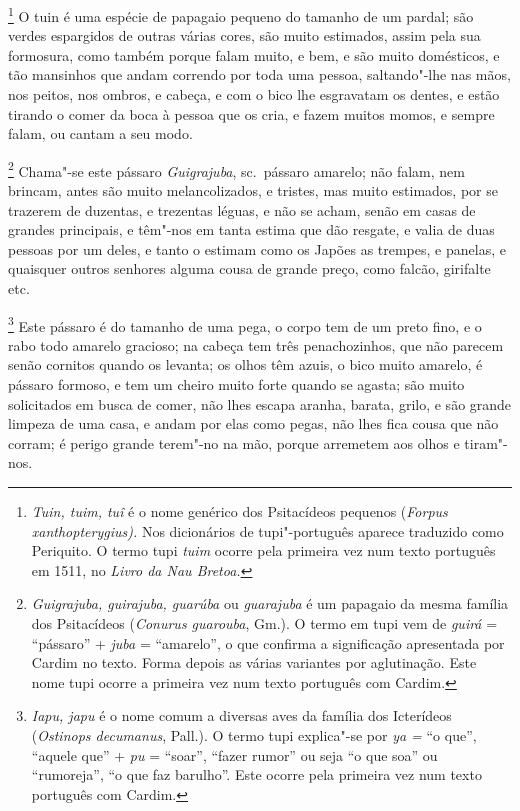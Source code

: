 \begin{linenumbers}
\footnote{ \textit{Tuin, tuim, tuî} é o nome genérico
dos Psitacídeos pequenos (\textit{Forpus xanthopterygius).} Nos
dicionários de tupi"-português aparece traduzido como Periquito. O termo
tupi \textit{tuim} ocorre pela primeira vez num texto português em
1511, no \textit{Livro da Nau Bretoa.}} O tuin é uma espécie
de papagaio pequeno do tamanho de um pardal; são verdes espargidos de
outras várias cores, são muito estimados, assim pela sua formosura,
como também porque falam muito, e bem, e são muito domésticos, e tão
mansinhos que andam correndo por toda uma pessoa, saltando"-lhe nas
mãos, nos peitos, nos ombros, e cabeça, e com o bico lhe esgravatam os
dentes, e estão tirando o comer da boca à pessoa que os cria, e fazem
muitos momos, e sempre falam, ou cantam a seu modo.

\footnote{ \textit{Guigrajuba, guirajuba,
guarúba} ou \textit{guarajuba} é um papagaio da mesma
família dos Psitacídeos (\textit{Conurus guarouba}, Gm.). O termo em
tupi vem de \textit{guirá} = ``pássaro'' + \textit{juba} = ``amarelo'', o
que confirma a significação apresentada por Cardim no texto. Forma
depois as várias variantes por aglutinação. Este nome tupi ocorre a
primeira vez num texto português com Cardim.} Chama"-se este
pássaro \textit{Guigrajuba}, sc.~pássaro amarelo; não falam, nem
brincam, antes são muito melancolizados, e tristes, mas muito
estimados, por se trazerem de duzentas, e trezentas léguas, e não se
acham, senão em casas de grandes principais, e têm"-nos em tanta estima
que dão resgate, e valia de duas pessoas por um deles, e tanto o
estimam como os Japões as trempes, e panelas, e quaisquer outros
senhores alguma cousa de grande preço, como falcão, girifalte etc.

\footnote{ \textit{Iapu, japu} é o nome comum a
diversas aves da família dos Icterídeos (\textit{Ostinops decumanus}, 
Pall.). O termo tupi explica"-se por \textit{ya =} ``o que'', ``aquele
que'' + \textit{pu} = ``soar'', ``fazer rumor'' ou seja ``o que soa'' ou
``rumoreja'', ``o que faz barulho''. Este ocorre pela primeira vez num
texto português com Cardim.} Este pássaro é do tamanho de uma
pega, o corpo tem de um preto fino, e o rabo todo amarelo gracioso; na
cabeça tem três penachozinhos, que não parecem senão cornitos quando os
levanta; os olhos têm azuis, o bico muito amarelo, é pássaro formoso, e
tem um cheiro muito forte quando se agasta; são muito solicitados em
busca de comer, não lhes escapa aranha, barata, grilo, e são grande
limpeza de uma casa, e andam por elas como pegas, não lhes fica cousa
que não corram; é perigo grande terem"-no na mão, porque arremetem aos
olhos e tiram"-nos.


\end{linenumbers}

